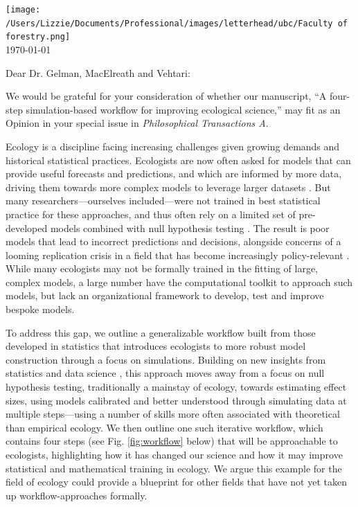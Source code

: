 \documentclass[11pt]{article}
\begin{document}

\renewcommand{\refname}{\CHead{}}

\hspace{-5ex} \texttt{[image: /Users/Lizzie/Documents/Professional/images/letterhead/ubc/Faculty of forestry.png]}
\vspace{1.5ex}\\

\setlength{\parindent}{0pt}
\setlength{\parskip}{7pt}
\today

Dear Dr. Gelman, MacElreath and Vehtari:

We would be grateful for your consideration of whether our manuscript, ``A four-step simulation-based workflow for improving ecological science,'' may fit as an Opinion in your special issue in \emph{Philosophical Transactions A}.

Ecology is a discipline facing increasing challenges given growing demands and historical statistical practices. Ecologists are now often asked for models that can provide useful forecasts and predictions, and which are informed by more data, driving them towards more complex models to leverage larger datasets \citep{anderson2021trends,muff2022rewriting}. But many researchers---ourselves included---were not trained in best statistical practice for these approaches, and thus often rely on a limited set of pre-developed models combined with null hypothesis testing \citep{hobbs2006alternatives,quinn1983hypothesis}. The result is poor models that lead to incorrect predictions and decisions, alongside concerns of a looming replication crisis \citep{filazzola2021replication,fraser2020role} in a field that has become increasingly policy-relevant \citep{hak2016sustainable,lindenmayer2010science}.  While many ecologists may not be formally trained in the fitting of large, complex models, a large number have the computational toolkit to approach such models, but lack an organizational framework to develop, test and improve bespoke models. 

To address this gap, we outline a generalizable workflow built from those developed in statistics  \citep{gelman2020bayesian,grinsztajn2021,vandeschoot2021} that introduces ecologists to more robust model construction through a focus on simulations. Building on new insights from statistics and data science \citep{gelman2020bayesian}, this approach moves away from a focus on null hypothesis testing, traditionally a mainstay of ecology, towards estimating effect sizes, using models calibrated and better understood through simulating data at multiple steps---using a number of skills more often associated with theoretical than empirical ecology. We then outline one such iterative workflow, which contains four steps (see Fig. \ref{fig:workflow} below) that will be approachable to ecologists,  highlighting how it has changed our science and how it may improve statistical and mathematical training in ecology. We argue this example for the field of ecology could provide a blueprint for other fields that have not yet taken up workflow-approaches formally. 
\end{document}

